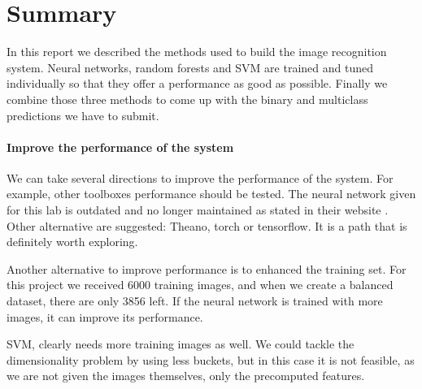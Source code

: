 \documentclass{article} %
\begin{document}
\section{Summary}

In this report we described the methods used to build the image recognition system. 
Neural networks, random forests and SVM are trained and tuned individually so that they offer a performance as good as possible.
Finally we combine those three methods to come up with the binary and multiclass predictions we have to submit. 

\paragraph{Improve the performance of the system}
We can take several directions to improve the performance of the system.
For example, other toolboxes performance should be tested. The neural network given for this lab is outdated and no longer maintained as stated in their website \cite{deeplearningtoolbox}. Other alternative are suggested: Theano, torch or tensorflow. It is a path that is definitely worth exploring.

Another alternative to improve performance is to enhanced the training set. 
For this project we received 6000 training images, and when we create a balanced dataset, there are only 3856 left.
If the neural network is trained with more images, it can improve its performance.

SVM, clearly needs more training images as well. We could tackle the dimensionality problem by using less buckets, but in this case it is not feasible, as we are not given the images themselves, only the precomputed features.



\end{document}
